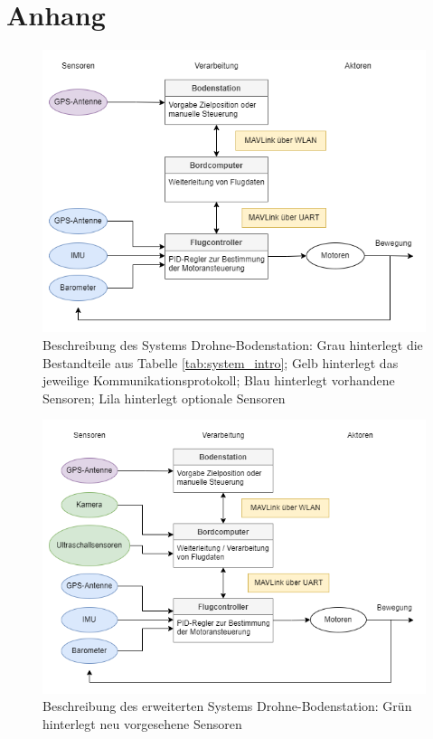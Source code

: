 \chapter{Anhang}

\begin{figure}[!ht]
    \centering
    \includegraphics[width=\linewidth]{images/001_vereinfacht-Page-3_default.drawio.png}
    \caption[Beschreibung des Systems Drohne-Bodenstation]{Beschreibung des Systems Drohne-Bodenstation: Grau hinterlegt die Bestandteile aus Tabelle \ref{tab:system_intro}; Gelb hinterlegt das jeweilige Kommunikationsprotokoll; Blau hinterlegt vorhandene Sensoren; Lila hinterlegt optionale Sensoren}
    \label{fig:system_intro}
\end{figure}

\begin{figure}[!ht]
    \centering
    \includegraphics[width=\linewidth]{images/001_vereinfacht-Page-3_erweitert.drawio.png}
    \caption[Beschreibung des erweiterten Systems Drohne-Bodenstation]{Beschreibung des erweiterten Systems Drohne-Bodenstation: Grün hinterlegt neu vorgesehene Sensoren}
    \label{fig:system_added_sensors}
\end{figure}


